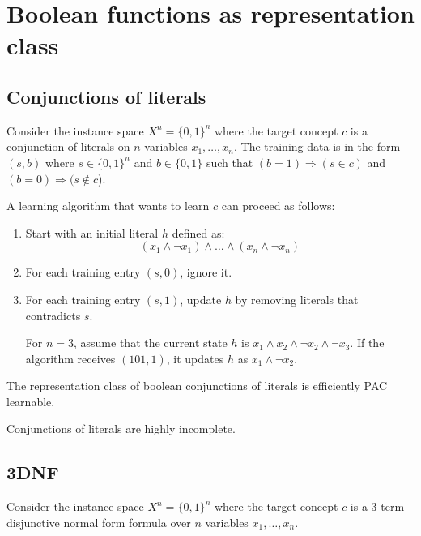 \section{Boolean functions as representation class}

\subsection{Conjunctions of literals}

Consider the instance space $X^n = \{ 0, 1 \}^n$ where 
the target concept $c$ is a conjunction of literals on $n$ variables $x_1, \dots, x_n$.
The training data is in the form $(s, b)$ where $s \in \{ 0, 1 \}^n$ and $b \in \{ 0, 1 \}$ such that
$(b = 1) \Rightarrow (s \in c)$ and $(b = 0) \Rightarrow (s \notin c$).

A learning algorithm that wants to learn $c$ can proceed as follows:
\begin{enumerate}
    \item Start with an initial literal $h$ defined as:
        \[ (x_1 \land \lnot x_1) \land \dots \land (x_n \land \lnot x_n) \]
    \item For each training entry $(s, 0)$, ignore it.
    \item For each training entry $(s, 1)$, update $h$ by removing literals that contradicts $s$.
        \begin{example}
            For $n = 3$, assume that the current state $h$ is $x_1 \land x_2 \land \lnot x_2 \land \lnot x_3$.
            If the algorithm receives $(101, 1)$, it updates $h$ as $x_1 \land \lnot x_2$.
        \end{example}
\end{enumerate}

\begin{theorem}
    The representation class of boolean conjunctions of literals is efficiently PAC learnable.
\end{theorem}

\begin{remark}
    Conjunctions of literals are highly incomplete.
\end{remark}


\subsection{3DNF}
Consider the instance space $X^n = \{ 0, 1 \}^n$ where
the target concept $c$ is a 3-term disjunctive normal form formula over $n$ variables $x_1, \dots, x_n$.

